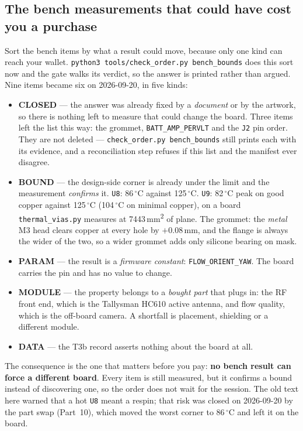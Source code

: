 \documentclass[11pt,a4paper]{article}
\newcommand{\file}[1]{\texttt{\small #1}}
\newcommand{\cmd}[1]{\texttt{\small #1}}
\newcommand{\flag}[1]{\textcolor{warnred}{\textbf{#1}}}
\newcommand{\degC}{$^\circ$C}
\begin{document}
\subsection{The bench measurements that could have cost you a purchase}
\label{sec:benchbounds}

Sort the bench items by what a result could move, because only one kind can reach your
wallet. \cmd{python3 tools/check\_order.py bench\_bounds} does this sort now and the gate walks its
verdict, so the answer is printed rather than argued. Nine items became six on 2026-09-20,
in five kinds:

\begin{itemize}
\item \textbf{CLOSED} --- the answer was already fixed by a \emph{document} or by the
artwork, so there is nothing left to measure that could change the board. Three items left
the list this way: the grommet, \file{BATT\_AMP\_PERVLT} and the \file{J2} pin order. They
are not deleted --- \file{check\_order.py bench\_bounds} still prints each with its evidence, and a
reconciliation step refuses if this list and the manifest ever disagree.
\item \textbf{BOUND} --- the design-side corner is already under the limit and the
measurement \emph{confirms} it. \file{U8}: 86\,\degC{} against 125\,\degC{}. \file{U9}:
82\,\degC{} peak on good copper against 125\,\degC{} (104\,\degC{} on minimal copper), on a
board \file{thermal\_vias.py} measures at 7443\,mm\textsuperscript{2} of plane. The grommet: the \emph{metal} M3 head clears
copper at every hole by $+$0.08\,mm, and the flange is always the wider of the two, so a wider
grommet adds only silicone bearing on mask.
\item \textbf{PARAM} --- the result is a \emph{firmware constant}: \file{FLOW\_ORIENT\_YAW}.
The board carries the pin and has no value to change.
\item \textbf{MODULE} --- the property belongs to a \emph{bought part} that plugs in: the
RF front end, which is the Tallysman HC610 active antenna, and flow quality, which is the off-board
camera. A shortfall is placement, shielding or a different module.
\item \textbf{DATA} --- the T3b record asserts nothing about the board at all.
\end{itemize}

The consequence is the one that matters before you pay: \flag{no bench result can force a
different board}. Every item is still measured, but it confirms a bound instead of
discovering one, so the order does not wait for the session. The old text here warned that a
hot \file{U8} meant a respin; that risk was closed on 2026-09-20 by the part swap (Part~10),
which moved the worst corner to 86\,\degC{} and left it on the board.
\end{document}
